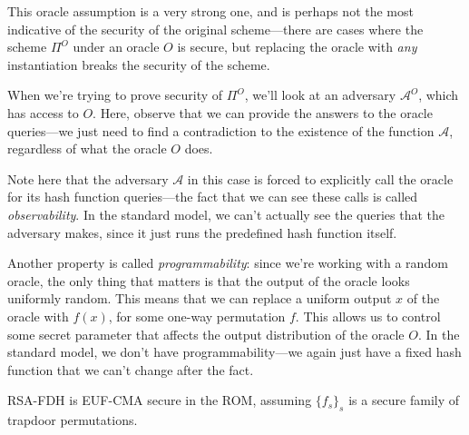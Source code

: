 This oracle assumption is a very strong one, and is perhaps not the most indicative of the security of the original scheme---there are cases where the scheme $\Pi^O$ under an oracle $O$ is secure, but replacing the oracle with \emph{any} instantiation breaks the security of the scheme.

When we're trying to prove security of $\Pi^O$, we'll look at an adversary $\mathcal{A}^O$, which has access to $O$. Here, observe that we can provide the answers to the oracle queries---we just need to find a contradiction to the existence of the function $\mathcal{A}$, regardless of what the oracle $O$ does.

Note here that the adversary $\mathcal{A}$ in this case is forced to explicitly call the oracle for its hash function queries---the fact that we can see these calls is called \emph{observability}. In the standard model, we can't actually see the queries that the adversary makes, since it just runs the predefined hash function itself.

Another property is called \emph{programmability}: since we're working with a random oracle, the only thing that matters is that the output of the oracle looks uniformly random. This means that we can replace a uniform output $x$ of the oracle with $f(x)$, for some one-way permutation $f$. This allows us to control some secret parameter that affects the output distribution of the oracle $O$. In the standard model, we don't have programmability---we again just have a fixed hash function that we can't change after the fact.

\begin{theorem}
    RSA-FDH is EUF-CMA secure in the ROM, assuming $\{f_s\}_s$ is a secure family of trapdoor permutations.
\end{theorem}

